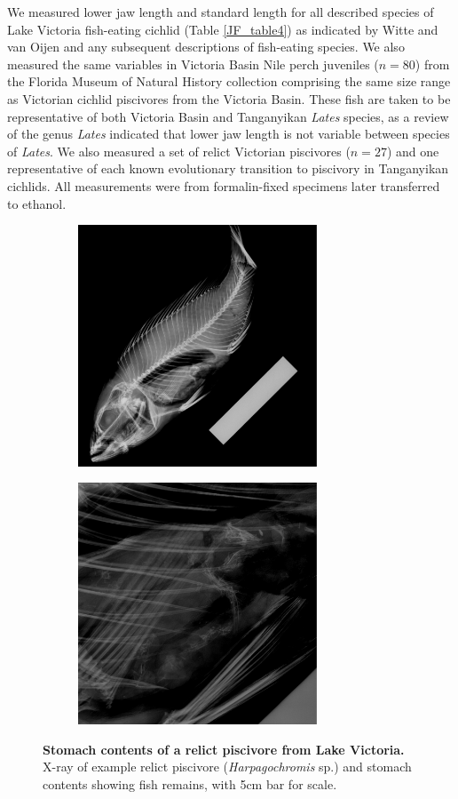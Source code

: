 We measured lower jaw length and standard length for all described species of Lake Victoria fish-eating cichlid (Table \ref{JF_table4}) as indicated by Witte and van Oijen \cite{witte1990taxonomy} and any subsequent descriptions of fish-eating species. \cite{van1991systematic, van1992haplochromis, van2004haplochromis, van2008haplochromis} We also measured the same variables in Victoria Basin Nile perch juveniles ($n=80$) from the Florida Museum of Natural History collection comprising the same size range as Victorian cichlid piscivores from the Victoria Basin. These fish are taken to be representative of both Victoria Basin and Tanganyikan {\em Lates} species, as a review \cite{greenwood1976review} of the genus {\em Lates} indicated that lower jaw length is not variable between species of {\em Lates}. We also measured a set of relict Victorian piscivores ($n=27$) and one representative of each known evolutionary transition to piscivory in Tanganyikan cichlids. All measurements were from formalin-fixed specimens later transferred to ethanol.

\begin{figure}
    \centering
    \begin{subfigure}[t]{2.8in}
        \includegraphics[width=2.8in]{FishJaws/figures/fig7a}
    \end{subfigure}
    \begin{subfigure}[t]{2.8in}
        \includegraphics[width=2.8in]{FishJaws/figures/fig7b}
    \end{subfigure}
    \caption{\textbf{Stomach contents of a relict piscivore from Lake Victoria.} X-ray of example relict piscivore ({\em Harpagochromis} sp.) and stomach contents showing fish remains, with 5cm bar for scale.}
    \label{FJ_fig8}
\end{figure}

